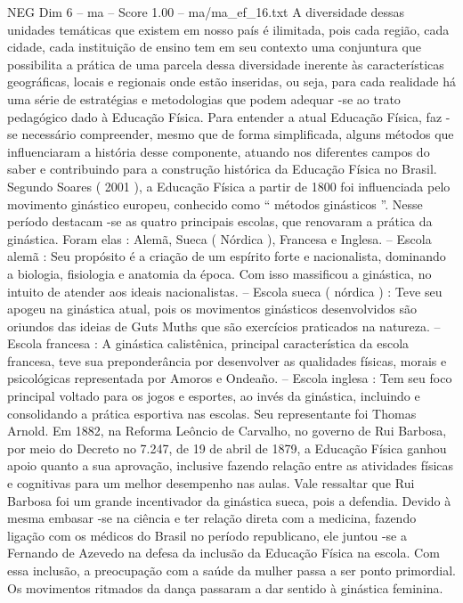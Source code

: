 \begin{textsample}{NEG Dim 6 – ma – Score 1.00 – ma/ma\_ef\_16.txt}
A diversidade dessas unidades temáticas que existem em nosso país é ilimitada, pois cada região, cada cidade, cada instituição de ensino tem em seu contexto uma conjuntura que possibilita a prática de uma parcela dessa diversidade inerente às características geográficas, locais e regionais onde estão inseridas, ou seja, para cada realidade há uma série de estratégias e metodologias que podem adequar -se ao trato pedagógico dado à Educação Física.
Para entender a atual Educação Física, faz -se necessário compreender, mesmo que de forma simplificada, alguns métodos que influenciaram a história desse componente, atuando nos diferentes campos do saber e contribuindo para a construção histórica da Educação Física no Brasil.
Segundo Soares ( 2001 ), a Educação Física a partir de 1800 foi influenciada pelo movimento ginástico europeu, conhecido como “ métodos ginásticos ”.
Nesse período destacam -se as quatro principais escolas, que renovaram a prática da ginástica.
Foram elas : Alemã, Sueca ( Nórdica ), Francesa e Inglesa. – Escola alemã : Seu propósito é a criação de um espírito forte e nacionalista, dominando a biologia, fisiologia e anatomia da época.
Com isso massificou a ginástica, no intuito de atender aos ideais nacionalistas. – Escola sueca ( nórdica ) : Teve seu apogeu na ginástica atual, pois os movimentos ginásticos desenvolvidos são oriundos das ideias de Guts Muths que são exercícios praticados na natureza. – Escola francesa : A ginástica calistênica, principal característica da escola francesa, teve sua preponderância por desenvolver as qualidades físicas, morais e psicológicas representada por Amoros e Ondeaño. – Escola inglesa : Tem seu foco principal voltado para os jogos e esportes, ao invés da ginástica, incluindo e consolidando a prática esportiva nas escolas.
Seu representante foi Thomas Arnold.
Em 1882, na Reforma Leôncio de Carvalho, no governo de Rui Barbosa, por meio do Decreto no 7.247, de 19 de abril de 1879, a Educação Física ganhou apoio quanto a sua aprovação, inclusive fazendo relação entre as atividades físicas e cognitivas para um melhor desempenho nas aulas.
Vale ressaltar que Rui Barbosa foi um grande incentivador da ginástica sueca, pois a defendia.
Devido à mesma embasar -se na ciência e ter relação direta com a medicina, fazendo ligação com os médicos do Brasil no período republicano, ele juntou -se a Fernando de Azevedo na defesa da inclusão da Educação Física na escola.
Com essa inclusão, a preocupação com a saúde da mulher passa a ser ponto primordial.
Os movimentos ritmados da dança passaram a dar sentido à ginástica feminina.

\end{textsample}
